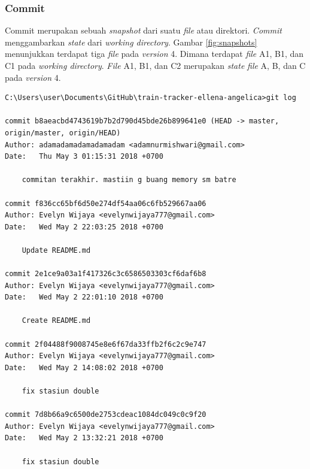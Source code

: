 \subsubsection{Commit}
Commit merupakan sebuah \textit{snapshot} dari suatu \textit{file} atau direktori. \textit{Commit} menggambarkan \textit{state} dari \textit{working directory}. Gambar \ref{fig:snapshots} menunjukkan terdapat tiga \textit{file} pada \textit{version} 4. Dimana terdapat \textit{file} A1, B1, dan C1 pada \textit{working directory}. \textit{File} A1, B1, dan C2  merupakan \textit{state} \textit{file} A, B, dan C pada \textit{version} 4. 



\begin{lstlisting}[caption={Contoh histori commit dalam pengembangan perangkat lunak},label={lst:git_histori},language=plaintext]
C:\Users\user\Documents\GitHub\train-tracker-ellena-angelica>git log

commit b8aeacbd4743619b7b2d790d45bde26b899641e0 (HEAD -> master, origin/master, origin/HEAD)
Author: adamadamadamadamadam <adamnurmishwari@gmail.com>
Date:   Thu May 3 01:15:31 2018 +0700

    commitan terakhir. mastiin g buang memory sm batre

commit f836cc65bf6d50e274df54aa06c6fb529667aa06
Author: Evelyn Wijaya <evelynwijaya777@gmail.com>
Date:   Wed May 2 22:03:25 2018 +0700

    Update README.md

commit 2e1ce9a03a1f417326c3c6586503303cf6daf6b8
Author: Evelyn Wijaya <evelynwijaya777@gmail.com>
Date:   Wed May 2 22:01:10 2018 +0700

    Create README.md

commit 2f04488f9008745e8e6f67da33ffb2f6c2c9e747
Author: Evelyn Wijaya <evelynwijaya777@gmail.com>
Date:   Wed May 2 14:08:02 2018 +0700

    fix stasiun double

commit 7d8b66a9c6500de2753cdeac1084dc049c0c9f20
Author: Evelyn Wijaya <evelynwijaya777@gmail.com>
Date:   Wed May 2 13:32:21 2018 +0700

    fix stasiun double
    
\end{lstlisting}

